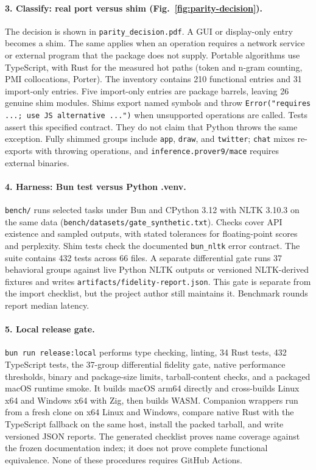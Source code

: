 \documentclass[pdflatex,sn-mathphys-num]{sn-jnl}
\theoremstyle{thmstyleone}
\begin{document}
\paragraph{3. Classify: real port versus shim (Fig.~\ref{fig:parity-decision}).}
The decision is shown in \texttt{parity\_decision.pdf}. A GUI or display-only entry becomes a shim. The same applies when an operation requires a network service or external program that the package does not supply. Portable algorithms use TypeScript, with Rust for the measured hot paths (token and n-gram counting, PMI collocations, Porter). The inventory contains 210 functional entries and 31 import-only entries. Five import-only entries are package barrels, leaving 26 genuine shim modules. Shims export named symbols and throw \texttt{Error("requires ...; use JS alternative ...")} when unsupported operations are called. Tests assert this specified contract. They do not claim that Python throws the same exception. Fully shimmed groups include \texttt{app}, \texttt{draw}, and \texttt{twitter}; \texttt{chat} mixes re-exports with throwing operations, and \texttt{inference.prover9/mace} requires external binaries.

\paragraph{4. Harness: Bun test versus Python .venv.}
\texttt{bench/} runs selected tasks under Bun and CPython 3.12 with NLTK 3.10.3 on the same data (\texttt{bench/datasets/gate\_synthetic.txt}). Checks cover API existence and sampled outputs, with stated tolerances for floating-point scores and perplexity. Shim tests check the documented \texttt{bun\_nltk} error contract. The suite contains 432 tests across 66 files. A separate differential gate runs 37 behavioral groups against live Python NLTK outputs or versioned NLTK-derived fixtures and writes \texttt{artifacts/fidelity-report.json}. This gate is separate from the import checklist, but the project author still maintains it. Benchmark rounds report median latency.

\paragraph{5. Local release gate.}
\texttt{bun run release:local} performs type checking, linting, 34 Rust tests, 432 TypeScript tests, the 37-group differential fidelity gate, native performance thresholds, binary and package-size limits, tarball-content checks, and a packaged macOS runtime smoke. It builds macOS arm64 directly and cross-builds Linux x64 and Windows x64 with Zig, then builds WASM. Companion wrappers run from a fresh clone on x64 Linux and Windows, compare native Rust with the TypeScript fallback on the same host, install the packed tarball, and write versioned JSON reports. The generated checklist proves name coverage against the frozen documentation index; it does not prove complete functional equivalence. None of these procedures requires GitHub Actions.
\end{document}
